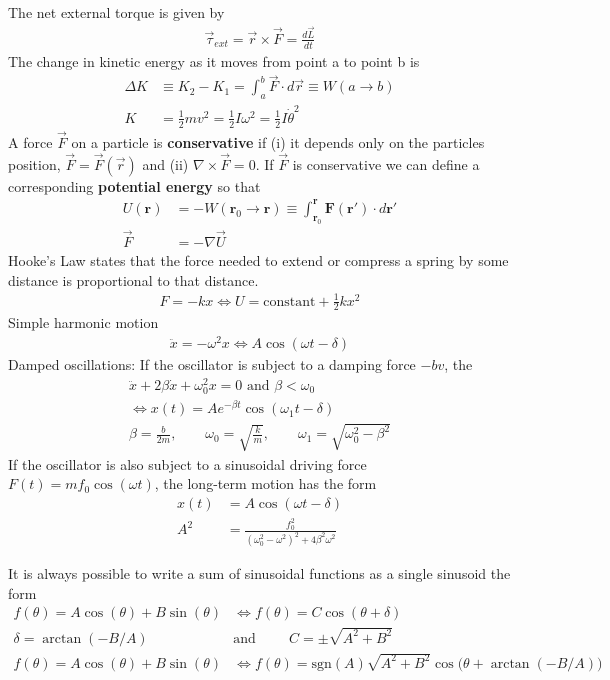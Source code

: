 \begin{multicols}{2}
The net external torque is given by
\begin{align}
\vec{\tau}_{ext} = \vec{r} \times \vec{F}= \frac{d\vec{L}}{dt}
\end{align}
The change in kinetic energy as it moves from point a to point b is
\begin{align}
\Delta K &\equiv K_2-K_1= \int_{a}^{b}\vec{F}\cdot d\vec{r} \equiv W(a \rightarrow b) \\
K &=\frac{1}{2}mv^2=\frac{1}{2}I\omega^2=\frac{1}{2}I\dot{\theta}^2
\end{align}
A force $\vec{F}$ on a particle is \textbf{conservative} if (i) it depends only on the particles position, $\vec{F}= \vec{F}(\vec{r})$ and (ii) $\nabla \times \vec{F} = 0$. If $\vec{F}$ is conservative we can define a corresponding \textbf{potential energy} so that
\begin{align}
U(\boldsymbol{r}) &= -W(\boldsymbol{r}_0 \rightarrow \boldsymbol{r}) \equiv \int_{\boldsymbol{r}_0}^{\boldsymbol{r}}\boldsymbol{F}(\boldsymbol{r} ')\cdot d\boldsymbol{r}' \\ 
\vec{F}&=-\nabla \vec{U}
\end{align}
Hooke's Law states that the force needed to extend or compress a spring by some distance is proportional to that distance.
\begin{align}
F=-kx \Longleftrightarrow U=\textrm{constant}+\frac{1}{2}kx^2
\end{align}	
Simple harmonic motion
\begin{align}
\ddot{x}=-\omega^2x \Longleftrightarrow A\cos(\omega t - \delta)
\end{align}
Damped oscillations: If the oscillator is subject to a damping force $-bv$, the
\begin{align}
\ddot{x}+2\beta\dot{x}+\omega_0^2x=0 \textrm{ and } \beta < \omega_0  \nonumber\\ \Longleftrightarrow x(t) =Ae^{-\beta t}\cos(\omega_1t-\delta) \\
\beta = \frac{b}{2m}, \textrm{ }\textrm{ }\textrm{ }
\omega_0 = \sqrt{\frac{k}{m}},\textrm{ }\textrm{ }\textrm{ }
\omega_1 = \sqrt{\omega_0^2-\beta^2}
\end{align}
If the oscillator is also subject to a sinusoidal driving force $F(t)=mf_0\cos(\omega t)$, the long-term motion has the form
\begin{align}
x(t)&=A\cos(\omega t-\delta) \\
A^2 &= \frac{f_0^2}{(\omega_0^2-\omega^2)^2+4\beta^2\omega^2}
\end{align}
\end{multicols}
It is always possible to write a sum of sinusoidal functions as a single sinusoid the form
\begin{align}
f(\theta)=A\cos(\theta)+B\sin(\theta) &\Longleftrightarrow  f(\theta)=C\cos(\theta+\delta) \\
\delta = \arctan(-B/A) \hspace{1cm}&\textrm{and}\hspace{1cm} C = \pm\sqrt{A^2+B^2} \\
f(\theta)=A\cos(\theta)+B\sin(\theta) &\Longleftrightarrow f(\theta)=\textrm{sgn}(A)\sqrt{A^2+B^2}\cos\big(\theta+\arctan(-B/A)\big)
\end{align} 


